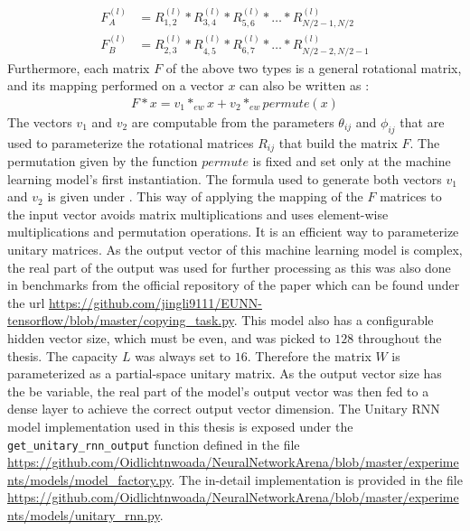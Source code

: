 \documentclass[draft,final]{vutinfth} %
\begin{document}
    \begin{align}
    F_A^{(l)} &= R_{1,2}^{(l)} * R_{3,4}^{(l)} * R_{5,6}^{(l)} * \ldots * R_{N/2-1,N/2}^{(l)} \\
    F_B^{(l)} &= R_{2,3}^{(l)} * R_{4,5}^{(l)} * R_{6,7}^{(l)} * \ldots * R_{N/2-2,N/2-1}^{(l)}
    \end{align}
    Furthermore, each matrix $F$ of the above two types is a general rotational matrix, and its mapping performed on a vector $x$ can also be written as \cite[p. 4]{EfficientUnitaryRNNs}:
    \begin{align}
    F*x = v_1 *_{ew} x + v_2 *_{ew} permute(x)
    \end{align}
    The vectors $v_1$ and $v_2$ are computable from the parameters $\theta_{ij}$ and $\phi_{ij}$ that are used to parameterize the rotational matrices $R_{ij}$ that build the matrix $F$.
    The permutation given by the function $permute$ is fixed and set only at the machine learning model's first instantiation. 
    The formula used to generate both vectors $v_1$ and $v_2$ is given under \cite[p. 4]{EfficientUnitaryRNNs}.
    This way of applying the mapping of the $F$ matrices to the input vector avoids matrix multiplications and uses element-wise multiplications and permutation operations. It is an efficient way to parameterize unitary matrices.
    As the output vector of this machine learning model is complex, the real part of the output was used for further processing as this was also done in benchmarks from the official repository of the paper \cite{EfficientUnitaryRNNs} which can be found under the url \url{https://github.com/jingli9111/EUNN-tensorflow/blob/master/copying_task.py}.
    This model also has a configurable hidden vector size, which must be even, and was picked to $128$ throughout the thesis.
    The capacity $L$ was always set to $16$. Therefore the matrix $W$ is parameterized as a partial-space unitary matrix.
    As the output vector size has the be variable, the real part of the model's output vector was then fed to a dense layer to achieve the correct output vector dimension.
    The Unitary RNN model implementation used in this thesis is exposed under the \texttt{get\_unitary\_rnn\_output} function defined in the file \url{https://github.com/Oidlichtnwoada/NeuralNetworkArena/blob/master/experiments/models/model_factory.py}.
    The in-detail implementation is provided in the file \url{https://github.com/Oidlichtnwoada/NeuralNetworkArena/blob/master/experiments/models/unitary_rnn.py}.
    
\end{document}
